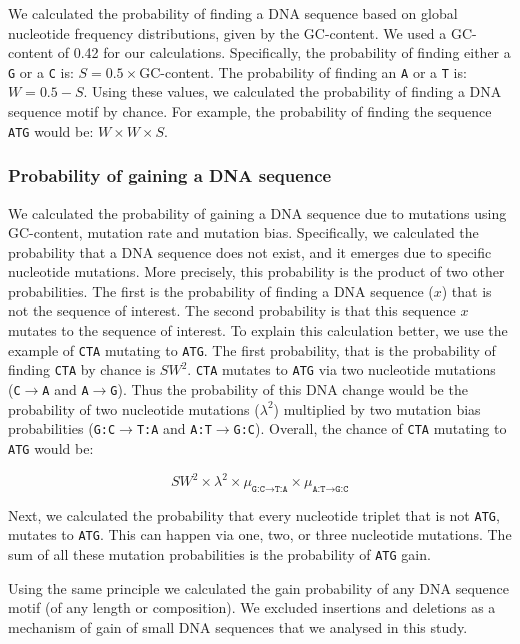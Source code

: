 \documentclass[12pt,a4paper]{article}
\begin{document}
We calculated the probability of finding a DNA sequence based on global nucleotide frequency distributions, given by the GC-content. We used a GC-content of 0.42 for our calculations. Specifically, the probability of finding either a \texttt{G} or a \texttt{C} is: $S = 0.5\times$GC-content. The probability of finding an \texttt{A} or a \texttt{T} is: $W = 0.5 - S$. Using these values, we calculated the probability of finding a DNA sequence motif by chance. For example, the probability of finding the sequence \texttt{ATG} would be: $W\times W \times S$.

\subsubsection{Probability of gaining a DNA sequence}
\label{methgain}

We calculated the probability of gaining a DNA sequence due to mutations using GC-content, mutation rate and mutation bias. Specifically, we calculated the probability that a DNA sequence does not exist, and it emerges due to specific nucleotide mutations. More precisely, this probability is the product of two other probabilities. The first is the probability of finding a DNA sequence ($x$) that is not the sequence of interest. The second probability is that this sequence $x$ mutates to the sequence of interest. To explain this calculation better, we use the example of \texttt{CTA} mutating to \texttt{ATG}. The first probability, that is the probability of finding \texttt{CTA} by chance is $SW^2$. \texttt{CTA} mutates to \texttt{ATG} via two nucleotide mutations (\texttt{C}$\to$\texttt{A} and \texttt{A}$\to$\texttt{G}). Thus the probability of this DNA change would be the probability of two nucleotide mutations ($\lambda^2$) multiplied by two mutation bias probabilities (\texttt{G:C}$\to$\texttt{T:A} and \texttt{A:T}$\to$\texttt{G:C}). Overall, the chance of \texttt{CTA} mutating to \texttt{ATG} would be:

$$SW^2 \times \lambda^2 \times \mu_{\texttt{G:C}\to\texttt{T:A}} \times \mu_{\texttt{A:T}\to\texttt{G:C}}$$

Next, we calculated the probability that every nucleotide triplet that is not \texttt{ATG}, mutates to \texttt{ATG}. This can happen via one, two, or three nucleotide mutations. The sum of all these mutation probabilities is the probability of \texttt{ATG} gain.

Using the same principle we calculated the gain probability of any DNA sequence motif (of any length or composition). We excluded insertions and deletions as a mechanism of gain of small DNA sequences that we analysed in this study. 
\end{document}
